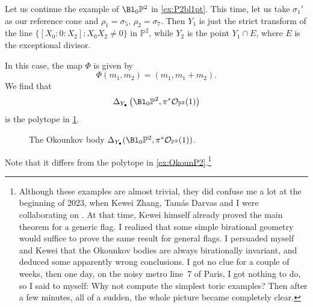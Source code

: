 \begin{example}\label{ex:toric-big:L532}
    Let us continue the example of $\Bl_{0}\mathbb{P}^2$ in \cref{ex:P2bl1pt}. This time, let us take $\sigma_1'$ as our reference cone and $\rho_1=\sigma_5$, $\rho_2=\sigma_7$. Then $Y_1$ is just the strict transform of the line $\{[X_0:0:X_2]:X_0X_2\neq 0\}$ in $\mathbb{P}^2$, while $Y_2$ is the point $Y_1\cap E$, where $E$ is the exceptional divisor.

    In this case, the map $\Phi$ is given by
    \[
    \Phi(m_1,m_2)=(m_1,m_1+m_2).
    \]
    We find that
    \[
    \Delta_{Y_{\bullet}}\left(\Bl_{0}\mathbb{P}^2,\pi^*\mathcal{O}_{\mathbb{P}^2}(1)\right)
    \]
    is the polytope in \cref{fig:P2b1pOkoun}.

    \begin{figure}[ht]
        \centering
        \caption{The Okounkov body $\Delta_{Y_{\bullet}}(\Bl_{0}\mathbb{P}^2,\pi^*\mathcal{O}_{\mathbb{P}^2}(1))$.}
        \label{fig:P2b1pOkoun}
    \end{figure}
    Note that it differs from the polytope in \cref{ex:OkounP2}.\footnote{Although these examples are almost trivial, they did confuse me a lot at the beginning of 2023, when Kewei Zhang, Tamás Darvas and I were collaborating on \cite{DRWNXZ}. At that time, Kewei himself already proved the main theorem for a generic flag. I realized that some simple birational geometry would suffice to prove the same result for general flags.
    I persuaded myself and Kewei that the Okounkov bodies are always birationally invariant, and deduced some apparently wrong conclusions. I got no clue for a couple of weeks, then one day, on the noisy metro line~7 of Paris, I got nothing to do, so I said to myself: Why not compute the simplest toric examples? Then after a few minutes, all of a sudden, the whole picture became completely clear.}
\end{example}

